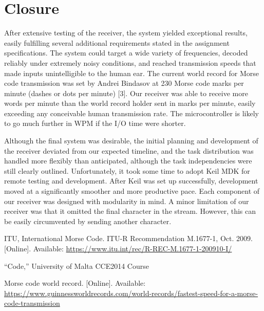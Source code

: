\documentclass[head=13.6pt]{cce2014-design}
\begin{document}
\section{Closure}
After extensive testing of the receiver, the system yielded exceptional results, easily fulfilling several additional requirements stated in the assignment specifications. The system could target a wide variety of frequencies, decoded reliably under extremely noisy conditions, and reached transmission speeds that made inputs unintelligible to the human ear. The current world record for Morse code transmission was set by Andrei Bindasov at 230 Morse code marks per minute (dashes or dots per minute) [3]. Our receiver was able to receive more words per minute than the world record holder sent in marks per minute, easily exceeding any conceivable human transmission rate. The microcontroller is likely to go much further in WPM if the I/O time were shorter.

Although the final system was desirable, the initial planning and development of the receiver deviated from our expected timeline, and the task distribution was handled more flexibly than anticipated, although the task independencies were still clearly outlined. Unfortunately, it took some time to adopt Keil MDK for remote testing and development. After Keil was set up successfully, development moved at a significantly smoother and more productive pace. Each component of our receiver was designed with modularity in mind. A minor limitation of our receiver was that it omitted the final character in the stream. However, this can be easily circumvented by sending another character.

\nocite{itu}

\begin{thebibliography}{9}

ITU, International Morse Code. ITU-R Recommendation M.1677-1, Oct. 2009. [Online]. Available: \url{https://www.itu.int/rec/R-REC-M.1677-1-200910-I/}

“Code,” University of Malta CCE2014 Course

Morse code world record. [Online]. Available: \url{https://www.guinnessworldrecords.com/world-records/fastest-speed-for-a-morse-code-transmission}

\end{thebibliography}
\end{document}
